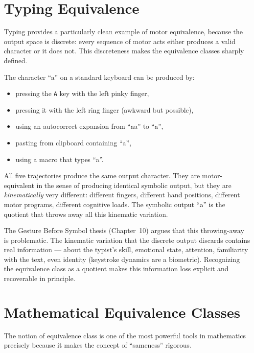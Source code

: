 \section{Typing Equivalence}

Typing provides a particularly clean example of motor equivalence, because
the output space is discrete: every sequence of motor acts either produces
a valid character or it does not. This discreteness makes the equivalence
classes sharply defined.

\begin{example}
  The character ``a'' on a standard keyboard can be produced by:
  \begin{itemize}
    \item pressing the \texttt{A} key with the left pinky finger,
    \item pressing it with the left ring finger (awkward but possible),
    \item using an autocorrect expansion from ``aa'' to ``a'',
    \item pasting from clipboard containing ``a'',
    \item using a macro that types ``a''.
  \end{itemize}
  All five trajectories produce the same output character. They are
  motor-equivalent in the sense of producing identical symbolic output,
  but they are \emph{kinematically} very different: different fingers,
  different hand positions, different motor programs, different cognitive
  loads. The symbolic output ``a'' is the quotient that throws away
  all this kinematic variation.
\end{example}

The Gesture Before Symbol thesis (Chapter~10) argues that this throwing-away
is problematic. The kinematic variation that the discrete output discards
contains real information — about the typist's skill, emotional state,
attention, familiarity with the text, even identity (keystroke dynamics
are a biometric). Recognizing the equivalence class as a quotient makes
this information loss explicit and recoverable in principle.

\section{Mathematical Equivalence Classes}

The notion of equivalence class is one of the most powerful tools in
mathematics precisely because it makes the concept of ``sameness'' rigorous.

